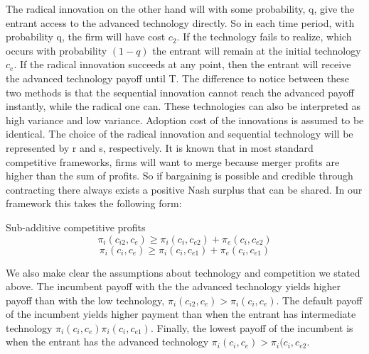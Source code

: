 The radical innovation on the other hand will with some probability, q, give the entrant access to the advanced technology directly. So in each time period, with probability q, the firm will have cost $c_2$. If the technology fails to realize, which occurs with probability $(1-q)$ the entrant will remain at the initial technology $c_e$. If the radical innovation succeeds at any point, then the entrant will receive the advanced technology payoff until T. 
The difference to notice between these two methods is that the sequential innovation cannot reach the advanced payoff instantly, while the radical one can. These technologies can also be interpreted as high variance and low variance. Adoption cost of the innovations is assumed to be identical. The choice of the radical innovation and sequential technology will be represented by r and s, respectively.  
It is known that in most standard competitive frameworks, firms will want to merge because merger profits are higher than the sum of profits. So if bargaining is possible and credible through contracting there always exists a positive Nash surplus that can be shared. In our framework this takes the following form: 
\begin{assumption}{Sub-additive competitive profits}\label{as1}
\begin{equation*}
\pi_{i}(c_{i2},c_{e}) \geq  \pi_{i}(c_{i},c_{e2}) + \pi_{e}(c_{i},c_{e2})
\end{equation*}
\begin{equation*}
\pi_{i}(c_{i},c_{e}) \geq  \pi_{i}(c_{i},c_{e1}) + \pi_{e}(c_{i},c_{e1})
\end{equation*}
\end{assumption}
We also make clear the assumptions about technology and competition we stated above. The incumbent payoff with the the advanced technology yields higher payoff than with the low technology, $\pi_{i}(c_{i2},c_{e})>\pi_{i}(c_{i},c_{e})$. The default payoff of the incumbent yields higher payment than when the entrant has intermediate technology $\pi_{i}(c_{i},c_{e}) \pi_{i}(c_{i},c_{e1})$. Finally, the lowest payoff of the incumbent is when the entrant has the advanced technology $\pi_{i}(c_{i},c_{e})>\pi_{i}(c_{i},c_{e2}$. 
